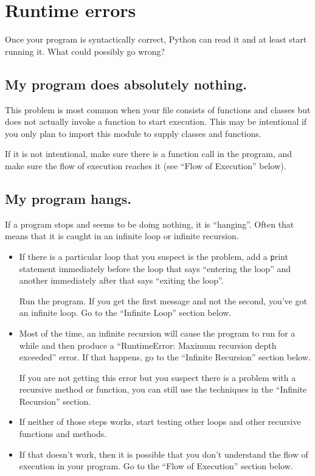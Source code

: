 \documentclass[
DIV=11,
fontsize=12,
twoside,
headinclude=false,
titlepage=firstiscover,
abstract=true,
headsepline=true,
footsepline=true,
chapterprefix=true, %
headings=big,
bibliography=totoc,%
captions=tableheading
]{scrbook}
\theoremstyle{definition}
\begin{document}
\section{Runtime errors}

Once your program is syntactically correct,
Python can read it and at least start running it.  What could
possibly go wrong?


\subsection{My program does absolutely nothing.}

This problem is most common when your file consists of functions and
classes but does not actually invoke a function to start execution.
This may be intentional if you only plan to import this module to
supply classes and functions.

If it is not intentional, make sure there is a function call
in the program, and make sure the flow of execution reaches
it (see ``Flow of Execution'' below).


\subsection{My program hangs.}

If a program stops and seems to be doing nothing, it is ``hanging''.
Often that means that it is caught in an infinite loop or infinite
recursion.

\begin{itemize}

\item If there is a particular loop that you suspect is the
problem, add a {\texttt print} statement immediately before the loop that says
``entering the loop'' and another immediately after that says
``exiting the loop''.

Run the program.  If you get the first message and not the second,
you've got an infinite loop.  Go to the ``Infinite Loop'' section
below.

\item Most of the time, an infinite recursion will cause the program
to run for a while and then produce a ``RuntimeError: Maximum
recursion depth exceeded'' error.  If that happens, go to the
``Infinite Recursion'' section below.

If you are not getting this error but you suspect there is a problem
with a recursive method or function, you can still use the techniques
in the ``Infinite Recursion'' section.

\item If neither of those steps works, start testing other
loops and other recursive functions and methods.

\item If that doesn't work, then it is possible that
you don't understand the flow of execution in your program.
Go to the ``Flow of Execution'' section below.

\end{itemize}
\end{document}
